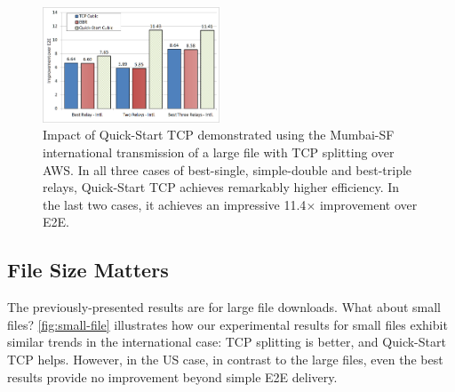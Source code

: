 \documentclass[10pt,sigconf]{acmart}
\newcommand{\mycomm}[3]{{\color{#2} \textbf{[#1: #3]}}}
\newcommand{\mycomm}[3]{}
\newcommand{\IK}[1]{\mycomm{IK}{blue}{#1}}
\newcommand{\AB}[1]{\mycomm{AB}{orange}{#1}}
\newcommand{\NR}[1]{\mycomm{NR}{violet}{#1}}
\begin{document}







\begin{figure}[!t]
  \centering
    \includegraphics[width=0.47\textwidth,trim=2mm 2mm 2mm 2mm,clip]{figures/aggressive.png}
    \caption{Impact of Quick-Start TCP demonstrated using the Mumbai-SF international transmission of a large file with TCP splitting over AWS. In all three cases of best-single, simple-double and best-triple relays, Quick-Start TCP achieves remarkably higher efficiency. In the last two cases, it achieves an impressive 11.4$\times$ improvement over E2E.
   }
    \label{fig:aggressive}
\end{figure}





\subsection{File Size Matters}
The previously-presented results are for large file downloads. What about small files? \autoref{fig:small-file} illustrates how our experimental results for small files exhibit similar trends in the international case: TCP splitting is better, and Quick-Start TCP helps. However, in the US case, in contrast to the large files, even the best results provide no improvement beyond simple E2E delivery. 
\end{document}
